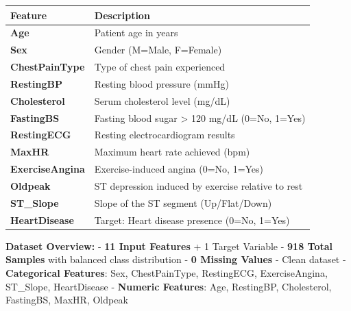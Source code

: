 \documentclass[11pt]{article}
\begin{document}
{\def\LTcaptype{none} %
\begin{longtable}[]{@{}ll@{}}
\toprule\noalign{}
Feature & Description \\
\midrule\noalign{}
\endhead
\bottomrule\noalign{}
\endlastfoot
\textbf{Age} & Patient age in years \\
\textbf{Sex} & Gender (M=Male, F=Female) \\
\textbf{ChestPainType} & Type of chest pain experienced \\
\textbf{RestingBP} & Resting blood pressure (mmHg) \\
\textbf{Cholesterol} & Serum cholesterol level (mg/dL) \\
\textbf{FastingBS} & Fasting blood sugar \textgreater{} 120 mg/dL (0=No,
1=Yes) \\
\textbf{RestingECG} & Resting electrocardiogram results \\
\textbf{MaxHR} & Maximum heart rate achieved (bpm) \\
\textbf{ExerciseAngina} & Exercise-induced angina (0=No, 1=Yes) \\
\textbf{Oldpeak} & ST depression induced by exercise relative to rest \\
\textbf{ST\_Slope} & Slope of the ST segment (Up/Flat/Down) \\
\textbf{HeartDisease} & Target: Heart disease presence (0=No, 1=Yes) \\
\end{longtable}
}

\textbf{Dataset Overview:} - \textbf{11 Input Features} + 1 Target
Variable - \textbf{918 Total Samples} with balanced class distribution -
\textbf{0 Missing Values} - Clean dataset - \textbf{Categorical
Features}: Sex, ChestPainType, RestingECG, ExerciseAngina, ST\_Slope,
HeartDisease - \textbf{Numeric Features}: Age, RestingBP, Cholesterol,
FastingBS, MaxHR, Oldpeak
\end{document}
